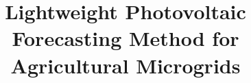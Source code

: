 \title{\bf Lightweight Photovoltaic Forecasting Method for Agricultural Microgrids}

\address{$^1$ Middle East Technical University Department of Electrical and Electronics Engineering \\ {paul.brown@metu.edu.tr, mgol@metu.edu.tr}\\
}